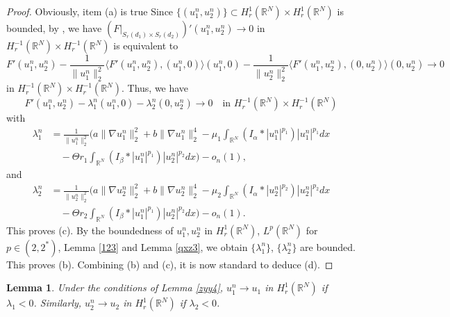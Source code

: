 \documentclass[10pt,a4paper]{amsart}
\numberwithin{equation}{section}
\newtheorem{lemma}[theo]{Lemma}
\begin{document}
\begin{proof}
Obviously, item (a) is true 
Since $\{(u_1^n,u_2^n)\}\subset H_r^1(\mathbb{R}^N)\times H_r^1(\mathbb{R}^N)$ 
is bounded, by \cite{Arm2},
we have $(F|_{S_r(d_1)\times S_r(d_2)})'(u_1^n,u_2^n)\to 0$ in 
$H_r^{-1}(\mathbb{R}^N)\times H_r^{-1}(\mathbb{R}^N)$ is
equivalent to
\[
F'(u_1^n,u_2^n)-\frac{1}{\| u_1^n\|_2^2}\langle F'(u_1^n,u_2^n),
(u_1^n,0)\rangle(u_1^n,0)-
\frac{1}{\| u_2^n\|_2^2}\langle F'(u_1^n,u_2^n),(0,u_2^n)\rangle(0,u_2^n)\to 0
\]
in $H_r^{-1}(\mathbb{R}^N)\times H_r^{-1}(\mathbb{R}^N)$. Thus, we have
\[
 F'(u_1^n,u_2^n)-\lambda_1^n(u_1^n,0)-\lambda_2^n(0,u_2^n)\to 0
 \quad \text{in } H_r^{-1}(\mathbb{R}^N)\times H_r^{-1}(\mathbb{R}^N)
\]
with
\begin{equation}\label{yjj1}
\begin{aligned}
\lambda_1^n&=\frac{1}{\| u_1^n\|_2^2}\Big(a\| \nabla u_1^n\|_2^2+b\| \nabla u_1^n\|_2^4-
\mu_1\int_{\mathbb{R}^N}(I_\alpha\ast|u_1^n|^{p_1})|u_1^n|^{p_1}dx \\
&\quad -\Theta r_1\int_{\mathbb{R}^N}(I_\beta\ast|u_1^n|^{p_1})|u_2^n|^{p_2}dx\Big)
-o_n(1),
\end{aligned}
\end{equation}
and
\begin{equation}\label{yjj2}
\begin{aligned}
 \lambda_2^n
&=\frac{1}{\| u_2^n\|_2^2}\Big(a\| \nabla u_2^n\|_2^2+b\| \nabla u_2^n\|_2^4-
 \mu_2\int_{\mathbb{R}^N}(I_\alpha\ast|u_2^n|^{p_2})|u_2^n|^{p_2}dx \\
&\quad -\Theta r_2\int_{\mathbb{R}^N}(I_\beta\ast|u_1^n|^{p_1})|u_2^n|^{p_2}dx\Big)-o_n(1).
\end{aligned}
 \end{equation}
This proves (c).
By the boundedness of $u_1^n,u_2^n$ in $H_r^1(\mathbb{R}^N)$, $L^p(\mathbb{R}^N)$
for $p\in(2,2^*)$, Lemma \ref{123} and Lemma \ref{qxz3},
we obtain $\{\lambda_1^n\}$, $\{\lambda_2^n\}$ are bounded. This proves (b).
Combining (b) and (c), it is now standard to deduce (d).
\end{proof}

\begin{lemma}\label{yuk9}
Under the conditions of Lemma \ref{zyy4},  $u_1^n\to  u_1$ in $H_r^1(\mathbb{R}^N)$
if $\lambda_1<0$. Similarly,
$u_2^n\to  u_2$ in $H_r^1(\mathbb{R}^N)$ if $\lambda_2<0$.
\end{lemma}
\end{document}
